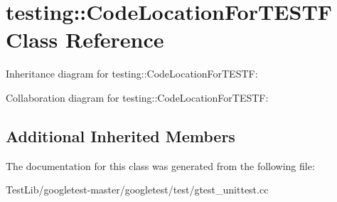 \hypertarget{classtesting_1_1CodeLocationForTESTF}{}\section{testing\+:\+:Code\+Location\+For\+T\+E\+S\+TF Class Reference}
\label{classtesting_1_1CodeLocationForTESTF}


Inheritance diagram for testing\+:\+:Code\+Location\+For\+T\+E\+S\+TF\+:


Collaboration diagram for testing\+:\+:Code\+Location\+For\+T\+E\+S\+TF\+:
\subsection*{Additional Inherited Members}


The documentation for this class was generated from the following file\+:\begin{DoxyCompactItemize}
\item 
Test\+Lib/googletest-\/master/googletest/test/gtest\+\_\+unittest.\+cc\end{DoxyCompactItemize}
